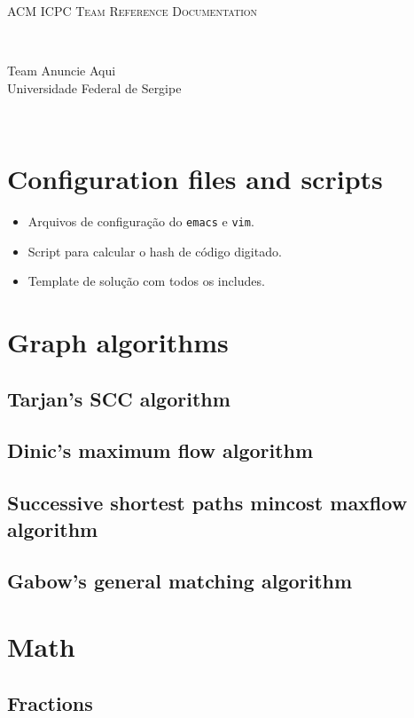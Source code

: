 \documentclass[a4paper]{amsart}
\begin{document}
  \thispagestyle{fancy}
  \begin{center}
    \Huge\textsc{ACM ICPC Team Reference Documentation}

    \ 
 
    \huge Team Anuncie Aqui \\ Universidade Federal de Sergipe

    \ 

  \end{center}

  \section{Configuration files and scripts}

	\begin{itemize}
		\item Arquivos de configuração do \texttt{emacs} e \texttt{vim}.
		\item Script para calcular o hash de código digitado.
		\item Template de solução com todos os includes.
	\end{itemize}

  \section{Graph algorithms}
    \subsection{Tarjan's SCC algorithm}
    \subsection{Dinic's maximum flow algorithm}
    \subsection{Successive shortest paths mincost maxflow algorithm}
    \subsection{Gabow's general matching algorithm}

  \section{Math}
    \subsection{Fractions}
\end{document}
